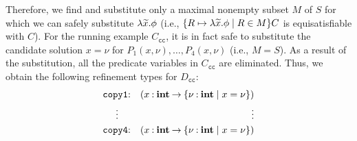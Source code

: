 Therefore, we find and substitute only a maximal nonempty subset \(M\) 
of \(S\) for which we can safely substitute \(\lambda\widetilde{x}.\phi\) (i.e., 
\(\{{R \mapsto \lambda\widetilde{x}.\phi \mid R \in M}\}C\) is equisatisfiable 
with \(C\)).
%
%
For the running example \(C_{\texttt{cc}}\), it is in fact safe to 
substitute the candidate solution \(x=\nu\) for 
\(P_1(x,\nu),\dots,P_4(x,\nu)\) (i.e., \(M=S\)).  As a result of the 
substitution, all the predicate variables in \(C_{\texttt{cc}}\) are 
eliminated.  Thus, we obtain the following refinement types for 
\(D_{\texttt{cc}}\):
\begin{eqnarray*}
\texttt{copy1}&\mathbin{:}&(x\mathbin{:}{\mathbf{int}}\mathbin{\rightarrow}{\{{\nu\mathbin{:}\mathbf{int} \mid x=\nu}\}}) \\
\vdots\quad &&\qquad\qquad \vdots \\
\texttt{copy4}&\mathbin{:}&(x\mathbin{:}{\mathbf{int}}\mathbin{\rightarrow}{\{{\nu\mathbin{:}\mathbf{int} \mid x=\nu}\}})
\end{eqnarray*}


%
